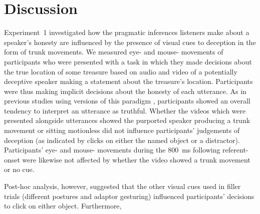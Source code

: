 \documentclass[a4paper,man,natbib]{apa6}
\begin{document}
\section{Discussion}
Experiment~1 investigated how the pragmatic inferences listeners make about a speaker's honesty are influenced by the presence of visual cues to deception in the form of trunk movements.
We measured eye- and mouse- movements of participants who were presented with a task in which they made decisions about the true location of some treasure based on audio and video of a potentially deceptive speaker making a statement about the treasure's location.
Participants were thus making implicit decisions about the honesty of each utterance.
As in previous studies using versions of this paradigm \citep{Loy2017, King2018}, participants showed an overall tendency to interpret an utterance as truthful.
Whether the videos which were presented alongside utterances showed the purported speaker producing a trunk movement or sitting motionless did not influence participants' judgements of deception (as indicated by clicks on either the named object or a distractor).
Participants' eye- and mouse- movements during the 800~ms following referent-onset were likewise not affected by whether the video showed a trunk movement or no cue.

Post-hoc analysis, however, suggested that the other visual cues used in filler trials (different postures and adaptor gesturing) influenced participants' decisions to click on either object. 
Furthermore, 
\end{document}
